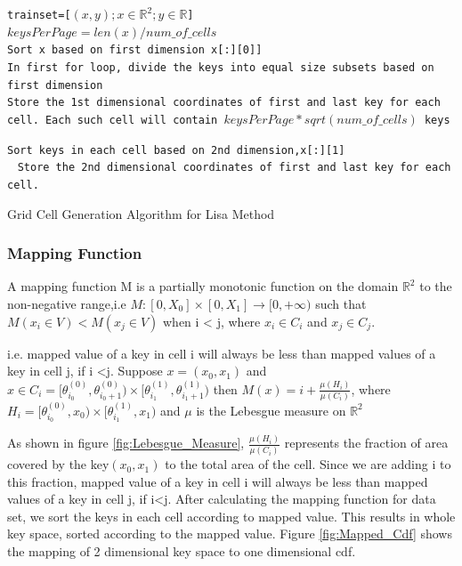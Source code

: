 \begin{algorithm}[H]
    \SetAlgoLined
     \texttt{trainset=[$(x,y);x \in \mathbb{R}^{2};y \in \mathbb{R}$]} \\
     \texttt{$keysPerPage =  len(x) / num\_of\_cells $}\\
     \texttt{Sort x based on first dimension x[:][0]]}\\
     \texttt{In first for loop, divide the keys into equal size subsets based on first dimension }\\
     {
        \texttt{Store the 1st dimensional coordinates of first and last key for each cell. Each such cell will contain $keysPerPage*sqrt(num\_of\_cells)$ keys } \\
     }
     
     \texttt{Sort keys in each cell based on 2nd dimension,x[:][1] }\\
     
      {
         \
         {
            \texttt{Store the 2nd dimensional coordinates of first and last key for each cell.} \\
		 }
      }
     \caption{Grid Cell Generation Algorithm for Lisa Method}
     \label{Training_Lisa_Baseline}
\end{algorithm}

\subsubsection{Mapping Function}
A mapping function M is a partially monotonic function on the domain $\mathbb{R}^{2}$ to the non-negative range,i.e $M:[0,X_{0}]\times[0,X_{1}]\to [0,+\infty)$ such that \\
    $ M(x_{i} \in V) <  M(x_{j} \in V)$ when i < j, where $x_{i} \in C_{i}$ and $x_{j} \in C_{j}$.
    
i.e. mapped value of a key in cell i will always be less than mapped values of a key in cell j, if i <j. 
Suppose $x = (x_{0}, x_{1})$ and $x \in C_{i} = [\theta^{(0)}_{i_0},\theta^{(0)}_{i_0+1}) \times [\theta^{(1)}_{i_1},\theta^{(1)}_{i_1+1}) $ then 
$M(x) = i+ \frac {\mu(H_{i})}{\mu(C_{i})} $, where $H_{i} = [\theta^{(0)}_{i_0},x_{0}) \times [\theta^{(1)}_{i_1},x_{1}) $ and $\mu$ is the Lebesgue measure on $\mathbb{R}^2$

As shown in figure \ref{fig:Lebesgue_Measure}, $\frac {\mu(H_{i})}{\mu(C_{i})}$ represents the fraction of area covered by the key$(x_{0}, x_{1})$ to the total area of the cell. Since we are adding i to this fraction, mapped value of a key in cell i will always be less than mapped values of a key in cell j, if i<j. After calculating the mapping function for data set, we sort the keys in each cell according to mapped value. This results in whole key space, sorted according to the mapped value. Figure \ref{fig:Mapped_Cdf} shows the mapping of 2 dimensional key space to one dimensional cdf.

